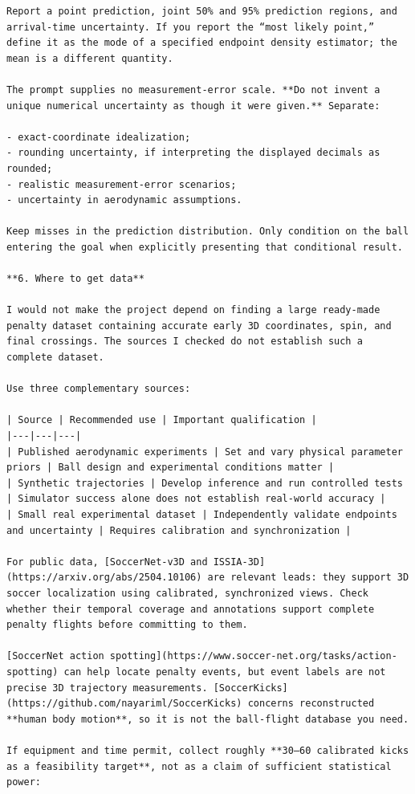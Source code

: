 \documentclass[UTF8,10pt]{ctexart}
\begin{document}
\begin{Verbatim}[breaklines=true,breakanywhere=true,fontsize=\scriptsize,frame=single,framesep=2pt]
Report a point prediction, joint 50% and 95% prediction regions, and arrival-time uncertainty. If you report the “most likely point,” define it as the mode of a specified endpoint density estimator; the mean is a different quantity.

The prompt supplies no measurement-error scale. **Do not invent a unique numerical uncertainty as though it were given.** Separate:

- exact-coordinate idealization;
- rounding uncertainty, if interpreting the displayed decimals as rounded;
- realistic measurement-error scenarios;
- uncertainty in aerodynamic assumptions.

Keep misses in the prediction distribution. Only condition on the ball entering the goal when explicitly presenting that conditional result.

**6. Where to get data**

I would not make the project depend on finding a large ready-made penalty dataset containing accurate early 3D coordinates, spin, and final crossings. The sources I checked do not establish such a complete dataset.

Use three complementary sources:

| Source | Recommended use | Important qualification |
|---|---|---|
| Published aerodynamic experiments | Set and vary physical parameter priors | Ball design and experimental conditions matter |
| Synthetic trajectories | Develop inference and run controlled tests | Simulator success alone does not establish real-world accuracy |
| Small real experimental dataset | Independently validate endpoints and uncertainty | Requires calibration and synchronization |

For public data, [SoccerNet-v3D and ISSIA-3D](https://arxiv.org/abs/2504.10106) are relevant leads: they support 3D soccer localization using calibrated, synchronized views. Check whether their temporal coverage and annotations support complete penalty flights before committing to them.

[SoccerNet action spotting](https://www.soccer-net.org/tasks/action-spotting) can help locate penalty events, but event labels are not precise 3D trajectory measurements. [SoccerKicks](https://github.com/nayariml/SoccerKicks) concerns reconstructed **human body motion**, so it is not the ball-flight database you need.

If equipment and time permit, collect roughly **30–60 calibrated kicks as a feasibility target**, not as a claim of sufficient statistical power:


\end{Verbatim}
\end{document}
